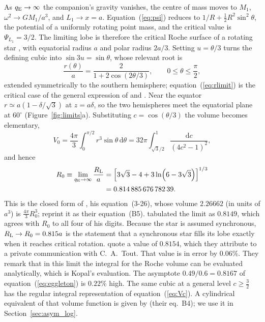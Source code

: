 \documentclass[twocolumn]{aastex702}
\newcommand{\qE}{q_{\rm E}}
\newcommand{\RL}{R_{\rm L}}
\newcommand{\dd}{\mathrm{d}}
\begin{document}
As $\qE\to\infty$ the companion's gravity vanishes, the centre of mass moves to $M_1$, $\omega^2\to GM_1/a^3$, and $L_1\to x=a$. Equation~(\ref{eq:psi}) reduces to $1/R+\tfrac12R^2\sin^2\theta$, the potential of a uniformly rotating point mass, and the critical value is $\Psi_{L_1}=3/2$. The limiting lobe is therefore the critical Roche surface of a rotating star \citep{Maeder2009}, with equatorial radius $a$ and polar radius $2a/3$. Setting $u=\theta/3$ turns the defining cubic into $\sin3u=\sin\theta$, whose relevant root is
\begin{equation}
\frac{r(\theta)}{a}=\frac{2}{1+2\cos(2\theta/3)},\qquad 0\le\theta\le\frac\pi2,
\label{eq:rlimit}
\end{equation}
extended symmetrically to the southern hemisphere; equation~(\ref{eq:rlimit}) is the critical case of the general expression of \citet{Collins1963} and \citet{CranmerOwocki1995}. Near the equator $r\simeq a(1-\delta/\sqrt3)$ at $z=a\delta$, so the two hemispheres meet the equatorial plane at $60^\circ$ (Figure~\ref{fig:limits}a). Substituting $c=\cos(\theta/3)$ the volume becomes elementary,
\begin{equation}
V_0=\frac{4\pi}{3}\int_0^{\pi/2}r^3\sin\theta\,\dd\theta
=32\pi\int_{\sqrt3/2}^{1}\frac{\dd c}{(4c^2-1)^2},
\end{equation}
and hence
\begin{equation}
\begin{split}
R_0\equiv\lim_{\qE\to\infty}\frac{\RL}{a}&=\left[3\sqrt3-4+3\ln\!\left(6-3\sqrt3\right)\right]^{1/3}\\
&=0.814\,885\,676\,782\,39.
\end{split}
\label{eq:R0}
\end{equation}
This is the closed form of \citet{Kopal1959}, his equation~(3-26), whose volume $2.26662$ (in units of $a^3$) is $\tfrac{4\pi}{3}R_0^3$; \citet{Paxton2019} reprint it as their equation~(B5). \citet{Eggleton1983} tabulated the limit as $0.8149$, which agrees with $R_0$ to all four of his digits. Because the star is assumed synchronous, $R_{\rm L}\to R_0=0.815a$ is the statement that a synchronous star fills its lobe exactly when it reaches critical rotation. \citet{Qi2026} quote a value of $0.8154$, which they attribute to a private communication with C.~A.\ Tout. That value is in error by $0.06\%$. They remark that in this limit the integral for the Roche volume can be evaluated analytically, which is Kopal's evaluation. The asymptote $0.49/0.6=0.8167$ of equation~(\ref{eq:eggleton}) is $0.22\%$ high. The same cubic at a general level $c\ge\tfrac32$ has the regular integral representation of equation~(\ref{eq:Vc}). A cylindrical equivalent of that volume function is given by \citet{Paxton2019} (their eq.~B4); we use it in Section~\ref{sec:asym_log}.
\end{document}
